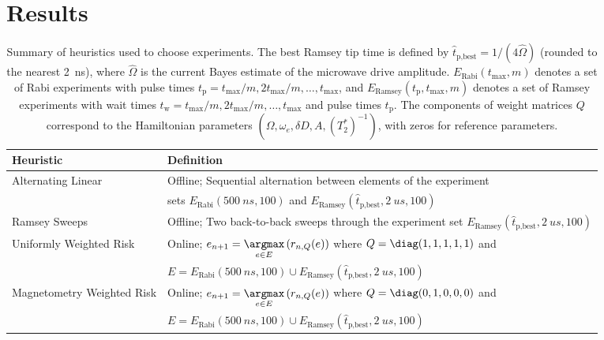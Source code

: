 \documentclass[aps,nofootinbib,twocolumn,superscriptaddress]{revtex4}
\newcommand{\Rabi}{\text{Rabi}}
\newcommand{\Ramsey}{\text{Ramsey}}
\newcommand{\tp}{t_\text{p}}
\newcommand{\tw}{t_\text{w}}
\begin{document}
\section{Results}
\label{sec:results}

\newcommand{\mystrut}{\rule{0pt}{1.5\normalbaselineskip}}
\begin{table*}[t]
    \centering
    \begin{tabularx}{\textwidth}{m{15em}X}
        \textbf{Heuristic} & \textbf{Definition} \\
        \hline\mystrut
        Alternating Linear
            & Offline; Sequential alternation between elements of 
                the experiment \\ 
                & sets
                $E_\Rabi(\SI{500}{ns},100)$ and 
                $E_\Ramsey(\hat{t}_{\text{p,best}},\SI{2}{us},100)$ \\
        \hline\mystrut
        Ramsey Sweeps
            & Offline; 
                Two back-to-back sweeps through
                the experiment set 
                $E_\Ramsey(\hat{t}_{\text{p,best}},\SI{2}{us},100)$ \\
        \hline\mystrut
        Uniformly Weighted Risk 
            & Online;
                $e_{n+1}=\underset{e\in E}{\argmax}\left(r_{n,Q}(e)\right)$
                where $Q=\diag(1,1,1,1,1)$ and \\
                & $E=E_\Rabi(\SI{500}{ns},100)\cup
                E_\Ramsey(\hat{t}_{\text{p,best}},\SI{2}{us},100)$ \\
        \hline\mystrut
        Magnetometry Weighted Risk
            & Online;
                    $e_{n+1}=\underset{e\in E}{\argmax}\left(r_{n,Q}(e)\right)$
                    where $Q=\diag(0,1,0,0,0)$ and \\
                    & $E=E_\Rabi(\SI{500}{ns},100)\cup
                    E_\Ramsey(\hat{t}_{\text{p,best}},\SI{2}{us},100)$ \\
        \hline
    \end{tabularx}
    \caption{Summary of heuristics used to choose experiments.
        The best Ramsey tip time is defined by
        $\hat{t}_{\text{p,best}}=1/(4\hat{\Omega})$ (rounded to the nearest
        \SI{2}{ns}), where $\hat\Omega$ is the current
        Bayes estimate of the microwave drive amplitude.
        $E_\Rabi(t_{\max},m)$ denotes a set of Rabi experiments with pulse 
        times $\tp=t_{\max}/m,2t_{\max}/m,\ldots,t_{\max}$, and 
        $E_\Ramsey(\tp, t_{\max},m)$ denotes a set of Ramsey experiments with wait times
        $\tw=t_{\max}/m,2t_{\max}/m,\ldots,t_{\max}$ and pulse times $\tp$.
        The components of weight matrices $Q$ correspond to the
        Hamiltonian parameters
        $(\Omega,\omega_e,\delta D,A,(T_2^*)^{-1})$, with
        zeros for reference parameters.
    }
    \label{tab:heuristics}
\end{table*}  
\end{document}
